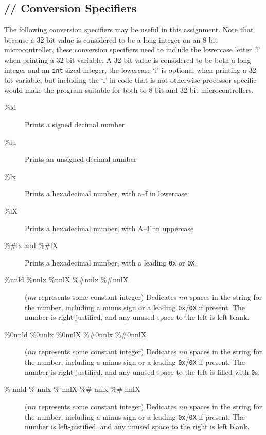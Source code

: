 \subsection{// Conversion Specifiers} \label{subsec:conversionSpecifiers}

The following conversion specifiers may be useful in this assignment.
Note that because a 32-bit value is considered to be a long integer on an 8-bit microcontroller, these conversion specifiers need to include the lowercase letter `l' when printing a 32-bit variable.
A 32-bit value is considered to be both a long integer and an \lstinline{int}-sized integer, the lowercase `l' is optional when printing a 32-bit variable, but including the `l' in code that is not otherwise processor-specific would make the program suitable for both to 8-bit and 32-bit microcontrollers.
\begin{description}
    \item[\%ld] Prints a signed decimal number
    \item[\%lu] Prints an unsigned decimal number
    \item[\%lx] Prints a hexadecimal number, with a--f in lowercase
    \item[\%lX] Prints a hexadecimal number, with A--F in uppercase
    \item[\%\#lx and \%\#lX] Prints a hexadecimal number, with a leading \lstinline{0x} or \lstinline{0X}.
    \item[\%nnld \%nnlx \%nnlX \%\#nnlx \%\#nnlX] ($nn$ represents some constant integer) Dedicates $nn$ spaces in the string for the number, including a minus sign or a leading \lstinline{0x}/\lstinline{0X} if present.
        The number is right-justified, and any unused space to the left is left blank.
    \item[\%0nnld \%0nnlx \%0nnlX \%\#0nnlx \%\#0nnlX] ($nn$ represents some constant integer) Dedicates $nn$ spaces in the string for the number, including a minus sign or a leading \lstinline{0x}/\lstinline{0X} if present.
        The number is right-justified, and any unused space to the left is filled with \lstinline{0}s.
    \item[\%-nnld \%-nnlx \%-nnlX \%\#-nnlx \%\#-nnlX] ($nn$ represents some constant integer) Dedicates $nn$ spaces in the string for the number, including a minus sign or a leading \lstinline{0x}/\lstinline{0X} if present.
        The number is left-justified, and any unused space to the right is left blank.
\end{description}